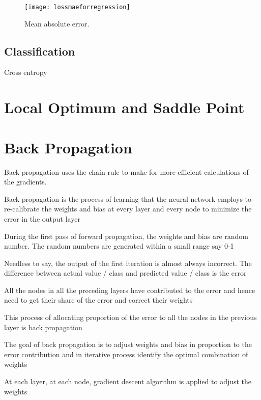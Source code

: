  	\begin{figure}[h]
		\centering
		\texttt{[image: lossmaeforregression]}
		\caption{Mean absolute error.}
		\label{fig:lossmaeforregression}
	\end{figure}

	\subsection{Classification}
Cross entropy


	\section{Local Optimum and Saddle Point}

	\section{Back Propagation}
Back propagation uses the chain rule to make for more efficient calculations of the gradients.

	\begin{bulletedlist}
		\item Back propagation is the process of learning that the neural network employs to re-calibrate the weights and bias at every layer and every node to minimize the error in the output layer
		\item During the first pass of forward propagation, the weights and bias are random number. The random numbers are generated within a small range say 0-1
		\item Needless to say, the output of the first iteration is almost always incorrect. The difference between actual value / class and predicted value / class is the error
		\item All the nodes in all the preceding layers have contributed to the error and hence need to get their share of the error and correct their weights
		\item This process of allocating proportion of the error to all the nodes in the previous layer is back propagation
		\item The goal of back propagation is to adjust weights and bias in proportion to the error contribution and in iterative process identify the optimal combination of weights
		\item At each layer, at each node, gradient descent algorithm is applied to adjust the weights
	\end{bulletedlist}

